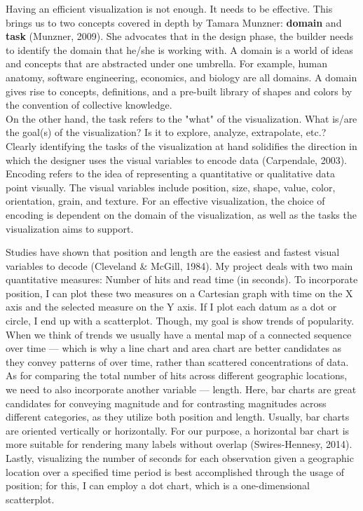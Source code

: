 \documentclass[12pt]{article}
\begin{document}
Having an efficient visualization is not enough. It needs to be effective. This brings us to two concepts covered in depth by Tamara Munzner: \textbf{domain} and \textbf{task} (Munzner, 2009). She advocates that in the design phase, the builder needs to identify the domain that he/she is working with. A domain is a world of ideas and concepts that are abstracted under one umbrella. For example, human anatomy, software engineering, economics, and biology are all domains. A domain gives rise to concepts, definitions, and a pre-built library of shapes and colors by the convention of collective knowledge. \\
On the other hand, the task refers to the "what" of the visualization. What is/are the goal(s) of the visualization? Is it to explore, analyze, extrapolate, etc.? Clearly identifying the tasks of the visualization at hand solidifies the direction in which the designer uses the visual variables to encode data (Carpendale, 2003). Encoding refers to the idea of representing a quantitative or qualitative data point visually. The visual variables include position, size, shape, value, color, orientation, grain, and texture. For an effective visualization, the choice of encoding is dependent on the domain of the visualization, as well as the tasks the visualization aims to support. 

Studies have shown that position and length are the easiest and fastest visual variables to decode (Cleveland \& McGill, 1984). My project deals with two main quantitative measures: Number of hits and read time (in seconds). To incorporate position, I can plot these two measures on a Cartesian graph with time on the X axis and the selected measure on the Y axis. If I plot each datum as a dot or circle, I end up with a scatterplot. Though, my goal is show trends of popularity. When we think of trends we usually have a mental map of a connected sequence over time --- which is why a line chart and area chart are better candidates as they convey patterns of over time, rather than scattered concentrations of data. \\
\noindent As for comparing the total number of hits across different geographic locations, we need to also incorporate another variable --- length. Here, bar charts are great candidates for conveying magnitude and for contrasting magnitudes across different categories, as they utilize both position and length. Usually, bar charts are oriented vertically or horizontally. For our purpose, a horizontal bar chart is more suitable for rendering many labels without overlap (Swires-Hennesy, 2014). Lastly, visualizing the number of seconds for each observation given a geographic location over a specified time period is best accomplished through the usage of position; for this, I can employ a dot chart, which is a one-dimensional scatterplot. 
\end{document}
